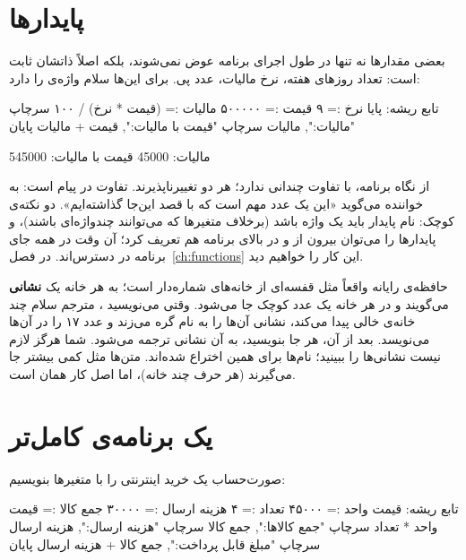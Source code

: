 \section{پایدارها}

بعضی مقدارها نه تنها در طول اجرای برنامه عوض نمی‌شوند، بلکه اصلاً ذاتشان
ثابت است: تعداد روزهای هفته، نرخ مالیات، عدد پی. برای این‌ها سلام واژه‌ی
 را دارد:

\begin{salamfa}
تابع ریشه:
    پایا نرخ := ۹
    قیمت := ۵۰۰۰۰۰
    مالیات := (قیمت * نرخ) / ۱۰۰
    سرچاپ "مالیات:", مالیات
    سرچاپ "قیمت با مالیات:", قیمت + مالیات
پایان
\end{salamfa}

\begin{outputfa}
مالیات: 45000
قیمت با مالیات: 545000
\end{outputfa}

از نگاه برنامه،  با 
تفاوت چندانی ندارد؛ هر دو تغییرناپذیرند. تفاوت در پیام است: 
به خواننده می‌گوید «این یک عدد مهم است که با قصد این‌جا گذاشته‌ایم». دو
نکته‌ی کوچک: نام پایدار باید یک واژه باشد (برخلاف متغیرها که می‌توانند
چندواژه‌ای باشند)، و پایدارها را می‌توان بیرون از  و در
بالای برنامه هم تعریف کرد؛ آن وقت در همه جای برنامه در دسترس‌اند. در فصل~\ref{ch:functions} این کار را خواهیم دید.

\begin{deep}
حافظه‌ی رایانه واقعاً مثل قفسه‌ای از خانه‌های شماره‌دار است؛ به هر خانه یک
\textbf{نشانی} می‌گویند و در هر خانه یک عدد کوچک جا می‌شود. وقتی می‌نویسید
، مترجم سلام چند خانه‌ی خالی پیدا می‌کند، نشانی آن‌ها
را به نام  گره می‌زند و عدد ۱۷ را در آن‌ها می‌نویسد. بعد از آن،
هر جا  بنویسید، به آن نشانی ترجمه می‌شود. شما هرگز لازم نیست
نشانی‌ها را ببینید؛ نام‌ها برای همین اختراع شده‌اند. متن‌ها مثل
 کمی بیشتر جا می‌گیرند (هر حرف چند خانه)، اما اصل کار همان
است.
\end{deep}

\section{یک برنامه‌ی کامل‌تر}

صورت‌حساب یک خرید اینترنتی را با متغیرها بنویسیم:

\begin{salamfa}
تابع ریشه:
    قیمت واحد := ۴۵۰۰۰
    تعداد := ۴
    هزینه ارسال := ۳۰۰۰۰
    جمع کالا := قیمت واحد * تعداد
    سرچاپ "جمع کالاها:", جمع کالا
    سرچاپ "هزینه ارسال:", هزینه ارسال
    سرچاپ "مبلغ قابل پرداخت:", جمع کالا + هزینه ارسال
پایان
\end{salamfa}

